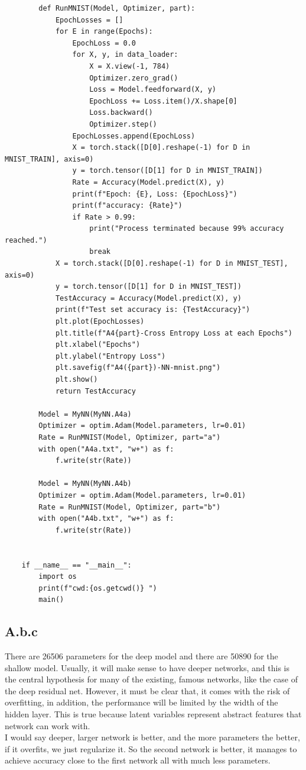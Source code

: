 \documentclass[]{article}
\begin{document}
\begin{lstlisting}
        def RunMNIST(Model, Optimizer, part):
            EpochLosses = []
            for E in range(Epochs):
                EpochLoss = 0.0
                for X, y, in data_loader:
                    X = X.view(-1, 784)
                    Optimizer.zero_grad()
                    Loss = Model.feedforward(X, y)
                    EpochLoss += Loss.item()/X.shape[0]
                    Loss.backward()
                    Optimizer.step()
                EpochLosses.append(EpochLoss)
                X = torch.stack([D[0].reshape(-1) for D in MNIST_TRAIN], axis=0)
                y = torch.tensor([D[1] for D in MNIST_TRAIN])
                Rate = Accuracy(Model.predict(X), y)
                print(f"Epoch: {E}, Loss: {EpochLoss}")
                print(f"accuracy: {Rate}")
                if Rate > 0.99:
                    print("Process terminated because 99% accuracy reached.")
                    break
            X = torch.stack([D[0].reshape(-1) for D in MNIST_TEST], axis=0)
            y = torch.tensor([D[1] for D in MNIST_TEST])
            TestAccuracy = Accuracy(Model.predict(X), y)
            print(f"Test set accuracy is: {TestAccuracy}")
            plt.plot(EpochLosses)
            plt.title(f"A4{part}-Cross Entropy Loss at each Epochs")
            plt.xlabel("Epochs")
            plt.ylabel("Entropy Loss")
            plt.savefig(f"A4({part})-NN-mnist.png")
            plt.show()
            return TestAccuracy

        Model = MyNN(MyNN.A4a)
        Optimizer = optim.Adam(Model.parameters, lr=0.01)
        Rate = RunMNIST(Model, Optimizer, part="a")
        with open("A4a.txt", "w+") as f:
            f.write(str(Rate))

        Model = MyNN(MyNN.A4b)
        Optimizer = optim.Adam(Model.parameters, lr=0.01)
        Rate = RunMNIST(Model, Optimizer, part="b")
        with open("A4b.txt", "w+") as f:
            f.write(str(Rate))


    if __name__ == "__main__":
        import os
        print(f"cwd:{os.getcwd()} ")
        main()
        \end{lstlisting}
    \subsection*{A.b.c}
        There are 26506 parameters for the deep model and there are 50890 for the shallow model. Usually, it will make sense to have deeper networks, and this is the central hypothesis for many of the existing, famous networks, like the case of the deep residual net. However, it must be clear that, it comes with the risk of overfitting, in addition, the performance will be limited by the width of the hidden layer. This is true because latent variables represent abstract features that network can work with.
        \\
        I would say deeper, larger network is better, and the more parameters the better, if it overfits, we just regularize it. So the second network is better, it manages to achieve accuracy close to the first network all with much less parameters.  
    
\end{document}
